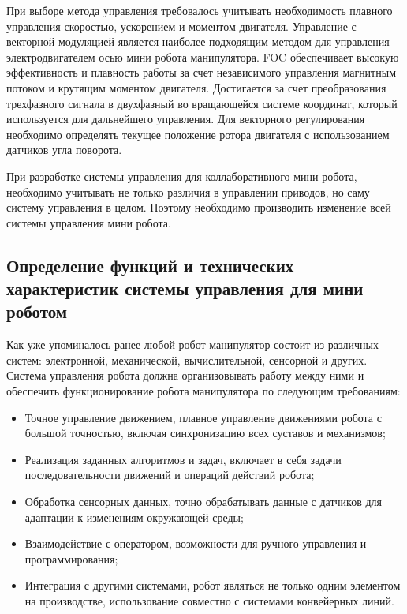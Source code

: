 При выборе метода управления требовалось учитывать необходимость плавного управления скоростью, ускорением и моментом двигателя. 
Управление с векторной модуляцией является наиболее подходящим методом для управления электродвигателем осью мини робота манипулятора. FOC обеспечивает высокую эффективность и плавность работы за счет независимого управления магнитным потоком и крутящим моментом двигателя. Достигается за счет преобразования трехфазного сигнала в двухфазный во вращающейся системе координат, который используется для дальнейшего управления. Для векторного регулирования необходимо определять текущее положение ротора двигателя с использованием датчиков угла поворота.

При разработке системы управления для коллаборативного мини робота, необходимо учитывать не только различия  в управлении приводов, но саму систему управления в целом. Поэтому необходимо производить изменение всей системы управления мини робота. 


\subsection{Определение функций и технических характеристик системы управления для мини роботом}

Как уже упоминалось ранее любой робот манипулятор состоит из различных систем: электронной, механической, вычислительной, сенсорной и других. Система управления робота должна организовывать работу между ними и обеспечить функционирование робота манипулятора по следующим требованиям:
\begin{itemize}
	\item Точное управление движением, плавное управление движениями робота с
	      большой точностью, включая синхронизацию всех суставов и механизмов;

	\item Реализация заданных алгоритмов и задач, включает в себя задачи
	      последовательности движений и операций действий робота;

	\item Обработка сенсорных данных, точно обрабатывать данные с датчиков для
	      адаптации к изменениям окружающей среды;

	\item Взаимодействие с оператором, возможности для ручного управления и
	      программирования;

	\item Интеграция с другими системами, робот являться не только одним
	      элементом на производстве, использование совместно с системами конвейерных
	      линий.
\end{itemize}


